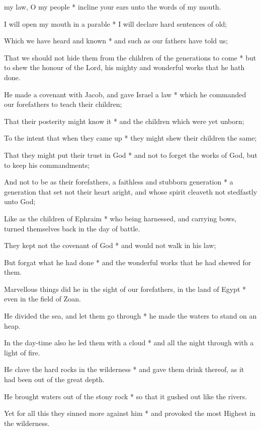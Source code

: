 
 my law, O my people * incline your ears unto the words of my mouth.

I will open my mouth in a parable * I will declare hard sentences of old;

Which we have heard and known * and such as our fathers have told us;

That we should not hide them from the children of the generations to come * but to shew the honour of the Lord, his mighty and wonderful works that he hath done.

He made a covenant with Jacob, and gave Israel a law * which he commanded our forefathers to teach their children;

That their posterity might know it * and the children which were yet unborn;

To the intent that when they came up * they might shew their children the same;

That they might put their trust in God * and not to forget the works of God, but to keep his commandments;

And not to be as their forefathers, a faithless and stubborn generation * a generation that set not their heart aright, and whose spirit cleaveth not stedfastly unto God;

Like as the children of Ephraim * who being harnessed, and carrying bows, turned themselves back in the day of battle.

They kept not the covenant of God * and would not walk in his law;

But forgat what he had done * and the wonderful works that he had shewed for them.

Marvellous things did he in the sight of our forefathers, in the land of Egypt * even in the field of Zoan.

He divided the sea, and let them go through * he made the waters to stand on an heap.

In the day-time also he led them with a cloud * and all the night through with a light of fire.

He clave the hard rocks in the wilderness * and gave them drink thereof, as it had been out of the great depth.

He brought waters out of the stony rock * so that it gushed out like the rivers.

Yet for all this they sinned more against him * and provoked the most Highest in the wilderness.


